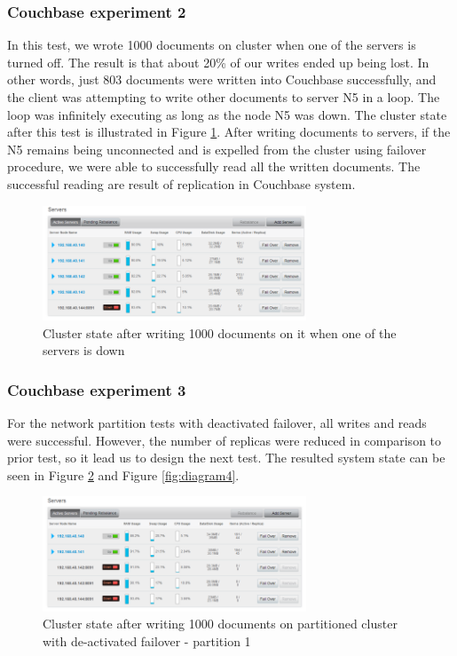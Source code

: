 \documentclass[a4paper]{article}
\begin{document}
\subsubsection{Couchbase experiment 2}

In this test, we wrote 1000 documents on cluster when one of the servers is turned off.
The result is that about 20\% of our writes ended up being lost.
In other words, just 803 documents were written into Couchbase successfully, and the client was attempting to write other documents to server N5 in a loop.
The loop was infinitely executing as long as the node N5 was down.
The cluster state after this test is illustrated in Figure \ref{fig:diagram2}.
After writing documents to servers, if the N5 remains being unconnected and is expelled from the cluster using failover procedure, we were able to successfully read all the written documents.
The successful reading are result of replication in Couchbase system.

\begin{figure}[h!]
	\centering
	\includegraphics[width=0.7\textwidth]{diagram2}
	\caption{Cluster state after writing 1000 documents on it when one of the servers is down}
	\label{fig:diagram2}
\end{figure}

\subsubsection{Couchbase experiment 3}
For the network partition tests with deactivated failover, all writes and reads were successful.  
However, the number of replicas were reduced in comparison to prior test, so it lead us to design the next test.
The resulted system state can be seen in Figure \ref{fig:diagram3} and Figure \ref{fig:diagram4}.

\begin{figure}[h!]
	\centering
	\includegraphics[width=0.7\textwidth]{diagram3}
	\caption{Cluster state after writing 1000 documents on partitioned cluster with de-activated failover - partition 1}
	\label{fig:diagram3}
\end{figure}
\end{document}
